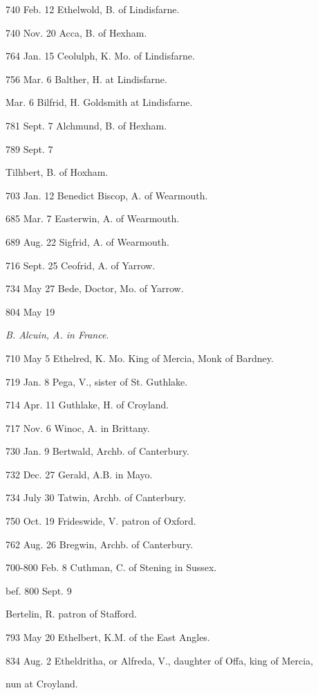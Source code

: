 740 Feb.
12
Ethelwold, B. of Lindisfarne.

740 Nov.
20
Acca, B. of Hexham.

764 Jan.
15
Ceolulph, K. Mo. of Lindisfarne.

756 Mar.
6
Balther, H. at Lindisfarne.

Mar. 6
Bilfrid, H. Goldsmith at Lindisfarne.

781 Sept.
7
Alchmund, B. of Hexham.

789 Sept.
7

Tilhbert, B. of Hoxham.


703 Jan.
12
Benedict
Biscop, A. of Wearmouth.

685 Mar.
7
Easterwin, A. of Wearmouth.

689 Aug.
22
Sigfrid, A. of Wearmouth.

716 Sept.
25
Ceofrid, A. of Yarrow.

734 May
27
Bede, Doctor, Mo. of Yarrow.

804 May
19

\emph{B. Alcuin, A. in France}.


710 May
5
Ethelred,
K. Mo. King of Mercia, Monk of Bardney.

719 Jan.
8
Pega, V., sister of St. Guthlake.

714 Apr.
11
Guthlake, H. of Croyland.

717 Nov.
6
Winoc, A. in Brittany.

730 Jan.
9
Bertwald, Archb. of Canterbury.

732 Dec.
27
Gerald, A.B. in Mayo.

734 July
30
Tatwin, Archb. of Canterbury.

750 Oct.
19
Frideswide, V. patron of Oxford.

762 Aug.
26
Bregwin, Archb. of Canterbury.

700-800 Feb.
8
Cuthman,
C. of Stening in Sussex.

bef. 800 Sept.
9

Bertelin,
R. patron of Stafford.


793 May
20
Ethelbert,
K.M. of the East Angles.

834 Aug.
2
Etheldritha, or Alfreda, V., daughter of Offa, king of Mercia,

nun at Croyland.

